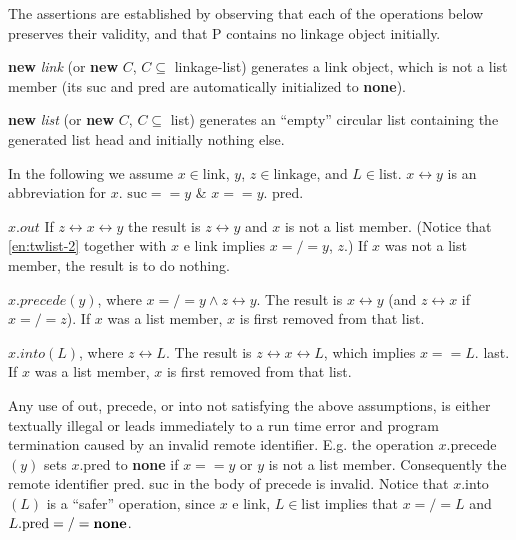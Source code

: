 The assertions are established by observing that each of the operations
below preserves their validity, and that P contains no linkage object initially.

\noindent
\textbf{new} \textit{link} (or \textbf{new} $C$, $C \subseteq$ linkage-list) generates a link object, which is not a list member (its suc and pred are automatically initialized to \textbf{none}).

\noindent
\textbf{new} \textit{list} (or \textbf{new} $C$, $C \subseteq$ list) generates an ``empty'' circular list containing the generated list head and initially nothing else.

\noindent
In the following we assume $x \in \text{link}$, $y$, $z \in \text{linkage}$, and $L \in \text{list}$. $x \leftrightarrow y$ is an abbreviation for $x$. $\text{suc} == y$ \& $x == y$. pred.

\noindent
$x.out$ If $z \leftrightarrow x \leftrightarrow y$ the result is $z \leftrightarrow y$ and $x$ is not a list member. (Notice that \ref{en:twlist-2} together with $x$ e link implies $x =/= y$, $z$.) If $x$ was not a list member, the result is to do nothing.

\noindent
$x.precede(y)$, where $x =/= y \land z \leftrightarrow y$. The result is $x \leftrightarrow y$ (and $z \leftrightarrow x$ if $x =/= z$). If $x$ was a list member, $x$ is first removed from that list.

\noindent
$x.into(L)$, where $z \leftrightarrow L$. The result is $z \leftrightarrow x \leftrightarrow L$, which implies $x == L$. last. If $x$ was a list member, $x$ is first removed from that list.

Any use of out, precede, or into not satisfying the above assumptions, is either textually illegal or leads immediately to a run time error and program termination caused by an invalid remote identifier. E.g. the operation $x$.precede$(y)$ sets $x$.pred to \textbf{none} if $x == y$ or $y$ is not a list member. Consequently the remote identifier pred. suc in the body of precede is invalid. Notice that $x$.into$(L)$ is a ``safer'' operation, since $x$ e link, $L \in \text{list}$ implies that $x =/= L$ and $L.\text{pred} =/= \text{\textbf{none}}$.

